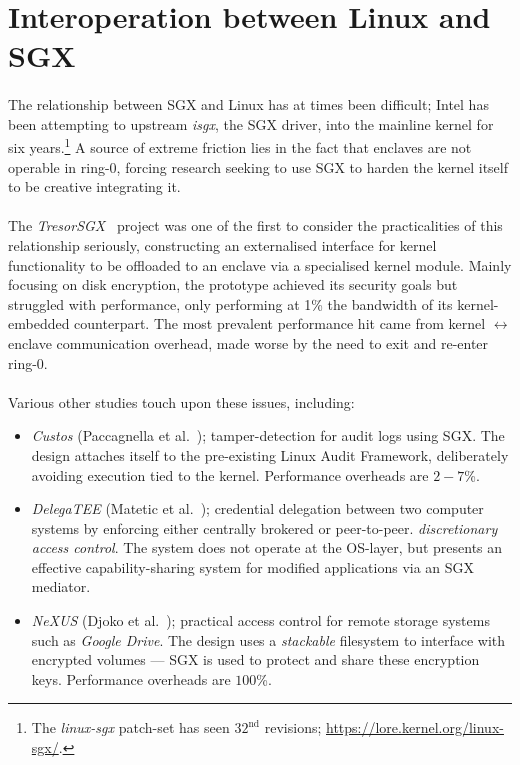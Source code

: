 \section{Interoperation between Linux and SGX} 
\paragraph{} The relationship between SGX and Linux has at times been difficult; Intel has been attempting to upstream \textit{isgx}, the SGX driver, into the mainline kernel for six years.\footnote{The \textit{linux-sgx} patch-set has seen $32^{\text{nd}}$ revisions; \url{https://lore.kernel.org/linux-sgx/}.} A source of extreme friction lies in the fact that enclaves are not operable in ring-0, forcing research seeking to use SGX to harden the kernel itself to be creative integrating it.

\paragraph{} The \textit{TresorSGX}~\cite{10.1145/3007788.3007796} project was one of the first to consider the practicalities of this relationship seriously, constructing an externalised interface for kernel functionality to be offloaded to an enclave via a specialised kernel module. Mainly focusing on disk encryption, the prototype achieved its security goals but struggled with performance, only performing at 1\% the bandwidth of its kernel-embedded counterpart. The most prevalent performance hit came from kernel $\leftrightarrow$ enclave communication overhead, made worse by the need to exit and re-enter ring-0.


\paragraph{} Various other studies touch upon these issues, including:

\begin{itemize}
    \item \textit{Custos} (Paccagnella et al.~\cite{Karande2017SGXLogSS}); tamper-detection for audit logs using SGX. The design attaches itself to the pre-existing Linux Audit Framework, deliberately avoiding execution tied to the kernel. Performance overheads are $2-7$\%. 
    \item \textit{DelegaTEE} (Matetic et al.~\cite{10.5555/3277203.3277308}); credential delegation between two computer systems by enforcing either centrally brokered or peer-to-peer. \textit{discretionary access control}. The system does not operate at the OS-layer, but presents an effective capability-sharing system for modified applications via an SGX mediator.
    \item \textit{NeXUS} (Djoko et al.~\cite{nexus8809505}); practical access control for remote storage systems such as \textit{Google Drive}. The design uses a \textit{stackable} filesystem to interface with encrypted volumes --- SGX is used to protect and share these encryption keys. Performance overheads are $100$\%.
\end{itemize}


